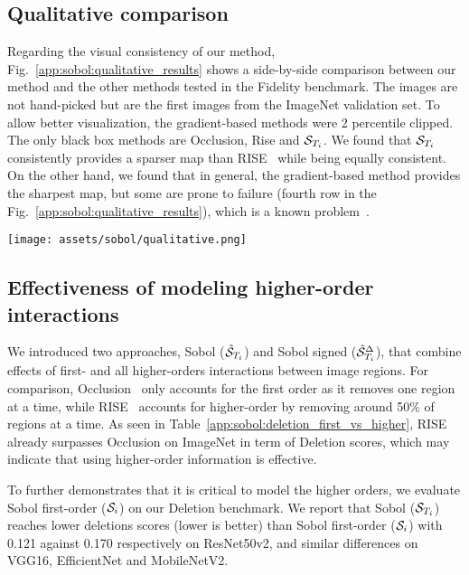 \subsection{Qualitative comparison}

Regarding the visual consistency of our method, Fig.~\ref{app:sobol:qualitative_results} shows a side-by-side comparison between our method and the other methods tested in the Fidelity benchmark. The images are not hand-picked but are the first images from the ImageNet validation set.
To allow better visualization, the gradient-based methods were 2 percentile clipped.
The only black box methods are Occlusion, Rise and $\mathcal{S}_{T_i}$. We found that $\mathcal{S}_{T_i}$ consistently provides a sparser map than RISE~\cite{petsiuk2018rise} while being equally consistent.
On the other hand, we found that in general, the gradient-based method provides the sharpest map, but some are prone to failure (fourth row in the Fig.~\ref{app:sobol:qualitative_results}), which is a known problem~\cite{adebayo2018sanity}.

\begin{figure*}[ht]
    \centering
    \texttt{[image: assets/sobol/qualitative.png]}
    \caption{\textbf{Qualitative comparison} with other explainability methods. The heatmaps are normalized and clipped at 2 percentile for Saliency, Guided-Backprop, DeconvNet, Smoothgrad and Integrated-Gradients.
    Explanations are generated from a ResNet50V2.
    }
    \label{app:sobol:qualitative_results}
\end{figure*}

\subsection{Effectiveness of modeling higher-order interactions}

We introduced two approaches, Sobol ($\hat{\mathcal{S}}_{T_i}$) and Sobol signed ($\hat{\mathcal{S}}^{\Delta}_{T_i}$), that combine effects of first- and all higher-orders interactions between image regions. For comparison, Occlusion~\cite{zeiler2014visualizing} only accounts for the first order as it removes one region at a time, while RISE~\cite{petsiuk2018rise} accounts for higher-order by removing around 50\% of regions at a time. As seen in Table~\ref{app:sobol:deletion_first_vs_higher}, RISE already surpasses Occlusion on ImageNet in term of Deletion scores, which may indicate that using higher-order information is effective.

To further demonstrates that it is critical to model the higher orders, we evaluate Sobol first-order ($\mathcal{S}_{i}$) on our Deletion benchmark.
We report that Sobol ($\mathcal{S}_{T_i}$) reaches lower deletions scores (lower is better) than Sobol first-order ($\mathcal{S}_{i}$) with 0.121 against 0.170 respectively on ResNet50v2, and similar differences on VGG16, EfficientNet and MobileNetV2.

